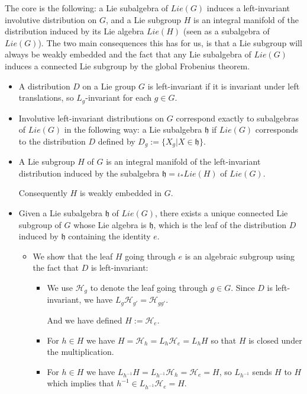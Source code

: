 \documentclass{report}
\theoremstyle{definition}
\begin{document}
The core is the following: a Lie subalgebra of $Lie(G)$ induces a left-invariant involutive distribution on $G$, and a Lie subgroup $H$ is an integral manifold of the distribution induced by its Lie algebra $Lie(H)$ (seen as a subalgebra of $Lie(G)$). The two main consequences this has for us, is that a Lie subgroup will always be weakly embedded and the fact that any Lie subalgebra of $Lie(G)$ induces a connected Lie subgroup by the global Frobenius theorem.
\begin{itemize}
    \item A distribution $D$ on a Lie group $G$ is left-invariant if it is invariant under left translations, so $L_g$-invariant for each $g\in G$.
    \item Involutive left-invariant distributions on $G$ correspond exactly to subalgebras of $Lie(G)$ in the following way: a Lie subalgebra $\mathfrak{h}$ if $Lie(G)$ corresponds to the distribution $D$ defined by $D_g:=\{X_g|X\in \mathfrak{h}\}$.
    \item A Lie subgroup $H$ of $G$ is an integral manifold of the left-invariant distribution induced by the subalgebra $\mathfrak{h}=\iota_*Lie(H)$ of $Lie(G)$.

    Consequently $H$ is weakly embedded in $G$.
    \item Given a Lie subalgebra $\mathfrak{h}$ of $Lie(G)$, there exists a unique connected Lie subgroup of $G$ whose Lie algebra is $\mathfrak{h}$, which is the leaf of the distribution $D$ induced by $\mathfrak{h}$ containing the identity $e$.

    \begin{itemize}
        \item We show that the leaf $H$ going through $e$ is an algebraic subgroup using the fact that $D$ is left-invariant:
        \begin{itemize}
            \item We use $\mathcal{H}_g$ to denote the leaf going through $g\in G$. Since $D$ is left-invariant, we have $L_g\mathcal{H}_{g'}=\mathcal{H}_{gg'}$.

            And we have defined $H:=\mathcal{H}_e$.
            \item For $h\in H$ we have $H=\mathcal{H}_h=L_h\mathcal{H}_e=L_hH$ so that $H$ is closed under the multiplication.
            \item For $h\in H$ we have $L_{h^{-1}}H=L_{h^{-1}}\mathcal{H}_{h}=\mathcal{H}_e=H$, so $L_{h^{-1}}$ sends $H$ to $H$ which implies that $h^{-1}\in L_{h^{-1}}\mathcal{H}_e=H$.


\end{itemize}
\end{itemize}
\end{itemize}
\end{document}
